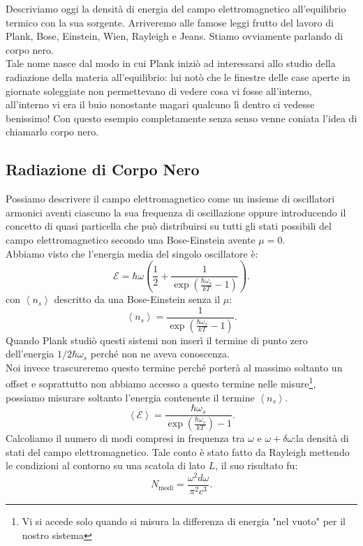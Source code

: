 Descriviamo oggi la densità di energia del campo elettromagnetico all'equilibrio termico con la sua sorgente. Arriveremo alle famose leggi frutto del lavoro di Plank, Bose, Einstein, Wien, Rayleigh e Jeans. Stiamo ovviamente parlando di corpo nero.\\
Tale nome nasce dal modo in cui Plank iniziò ad interessarsi allo studio della radiazione della materia all'equilibrio: lui notò che le finestre delle case aperte in giornate soleggiate non permettevano di vedere cosa vi fosse all'interno, all'interno vi era il buio nonostante magari qualcuno lì dentro ci vedesse benissimo! Con questo esempio completamente senza senso venne coniata l'idea di chiamarlo corpo nero.
\subsection{Radiazione di Corpo Nero}%
Possiamo descrivere il campo elettromagnetico come un insieme di oscillatori armonici aventi ciascuno la sua frequenza di oscillazione oppure introducendo il concetto di quasi particella che può distribuirsi su tutti gli stati possibili del campo elettromagnetico secondo una Bose-Einstein avente $\mu = 0$. \\
Abbiamo visto che l'energia media del singolo oscillatore è:
\[
	\mathcal{E} = \hbar\omega 
	\left( \frac{1}{2} + \frac{1}{\exp\left( \frac{\hbar \omega _{s}}{kT}-1 \right)} \right) 
.\] 
con $\left< n_{s} \right>$ descritto da una Bose-Einstein senza il $\mu $: \[
	\left<n_{s} \right> = \frac{1}{\exp\left( \frac{\hbar \omega _{s}}{kT}-1 \right) }
.\] 
Quando Plank studiò questi sistemi non inserì il termine di punto zero dell'energia $1 /2 \hbar\omega _{s}$  perché non ne aveva conoscenza. \\
Noi invece trascureremo questo termine perché porterà al massimo soltanto un offset e soprattutto non abbiamo accesso a questo termine nelle misure\footnote{Vi si accede solo quando si misura la differenza di energia "nel vuoto" per il nostro sistema}, possiamo misurare soltanto l'energia contenente il termine $\left<n_{s} \right>$.
\[
	\left<\mathcal{E}  \right> = \frac{\hbar \omega _{s}}{\exp\left( \frac{\hbar \omega _{s}}{kT} \right) -1}
.\] 
Calcoliamo il numero di modi compresi in frequenza tra $\omega $ e $\omega + \delta \omega $:la densità di stati del campo elettromagnetico. Tale conto è stato fatto da Rayleigh mettendo le condizioni al contorno su una scatola di lato $L$, il suo risultato fu: 
\[
	N_{\text{modi}}=\frac{\omega ^2 d\omega }{\pi^2 c^3} \label{eq:densita-stati}
.\] 

